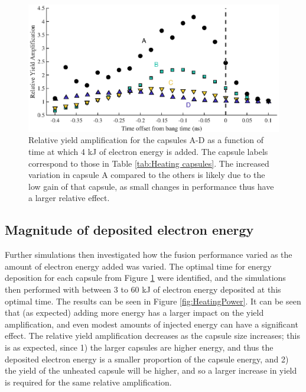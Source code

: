 \begin{figure}[ht]
\centering
\includegraphics{figures/FurtherSims/HeatingTiming.eps}
\caption{Relative yield amplification for the capsules A-D as a function of time at which 4 kJ of electron energy is added. The capsule labels correspond to those in Table \ref{tab:Heating capsules}. The increased variation in capsule A compared to the others is likely due to the low gain of that capsule, as small changes in performance thus have a larger relative effect.}
\label{fig:HeatingTiming}
\end{figure}

\subsection{Magnitude of deposited electron energy}

Further simulations then investigated how the fusion performance varied as the amount of electron energy added was varied. The optimal time for energy deposition for each capsule from Figure \ref{fig:HeatingTiming} were identified, and the simulations then performed with between 3 to 60 kJ of electron energy deposited at this optimal time. The results can be seen in Figure \ref{fig:HeatingPower}. It can be seen that (as expected) adding more energy has a larger impact on the yield amplification, and even modest amounts of injected energy can have a significant effect. The relative yield amplification decreases as the capsule size increases; this is as expected, since 1) the larger capsules are higher energy, and thus the deposited electron energy is a smaller proportion of the capsule energy, and 2) the yield of the unheated capsule will be higher, and so a larger increase in yield is required for the same relative amplification.

